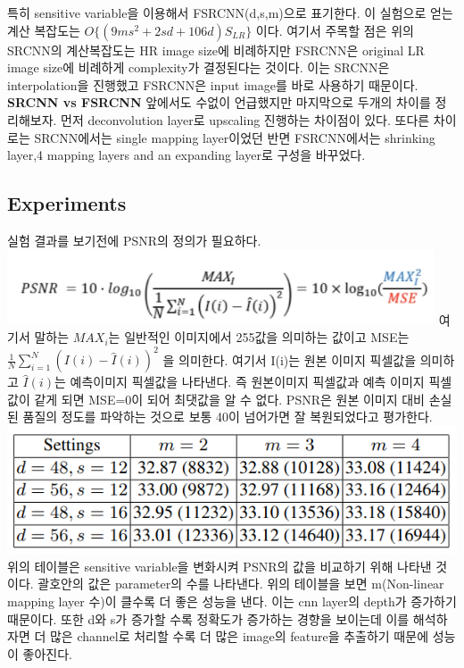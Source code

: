 \documentclass[extendedabs]{bmvc2k}
\begin{document}
 특히 sensitive variable을 이용해서 FSRCNN(d,s,m)으로 표기한다. 이 실험으로 얻는 계산 복잡도는 $ O\{(9ms^2+2sd+106d)S_{LR}\}$ 이다.
 여기서 주목할 점은 위의 SRCNN의 계산복잡도는 HR image size에 비례하지만 FSRCNN은 original LR image size에 비례하게 complexity가 결정된다는 것이다. 
 이는 SRCNN은 interpolation을 진행했고 FSRCNN은 input image를 바로 사용하기 때문이다. 
 \newline \quad \textbf{SRCNN vs FSRCNN}
 앞에서도 수없이 언급했지만 마지막으로 두개의 차이를 정리해보자. 먼저  deconvolution layer로 upscaling 진행하는 차이점이 있다.
 또다른 차이로는 SRCNN에서는 single mapping layer이었던 반면 FSRCNN에서는 shrinking layer,4 mapping layers and an expanding layer로 구성을 바꾸었다.

 \subsection{Experiments}
 실험 결과를 보기전에 PSNR의 정의가 필요하다. 
 \newline \includegraphics[width=\linewidth]{images/08_SR.PNG}
 여기서 말하는 $MAX_i$는 일반적인 이미지에서 255값을 의미하는 값이고 MSE는 $\frac{1}{N}\sum_{i=1}^{N}{(I(i)-\hat{I}(i))}^2$ 을 의미한다.
 여기서 I(i)는 원본 이미지 픽셀값을 의미하고 $\hat{I}(i)$는 예측이미지 픽셀값을 나타낸다. 즉 원본이미지 픽셀값과 예측 이미지 픽셀값이 같게 되면 MSE=0이 되어 최댓값을 알 수 없다.
 PSNR은 원본 이미지 대비 손실된 품질의 정도를 파악하는 것으로 보통 40이 넘어가면 잘 복원되었다고 평가한다.
 \newline \includegraphics[width=\linewidth]{images/07_SR.PNG}
 위의 테이블은 sensitive variable을 변화시켜 PSNR의 값을 비교하기 위해 나타낸 것이다. 괄호안의 값은 parameter의 수를 나타낸다.
위의 테이블을 보면 m(Non-linear mapping layer 수)이 클수록 더 좋은 성능을 낸다. 이는 cnn layer의 depth가 증가하기 때문이다. 
또한 d와 s가 증가할 수록 정확도가 증가하는 경향을 보이는데
이를 해석하자면 더 많은 channel로 처리할 수록 더 많은 image의 feature을 추출하기 때문에 성능이 좋아진다. 
\end{document}
